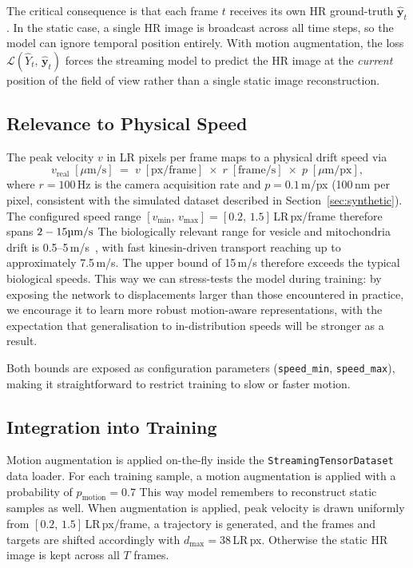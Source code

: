 The critical consequence is that each frame $t$ receives its own HR ground-truth
$\hat{\mathbf{y}}_t$.
In the static case, a single HR image is broadcast across all time steps, so the
model can ignore temporal position entirely.
With motion augmentation, the loss $\mathcal{L}(\hat{Y}_t,\,\hat{\mathbf{y}}_t)$
forces the streaming model to predict the HR image at the \emph{current} position
of the field of view rather than a single static image reconstruction.

\subsection{Relevance to Physical Speed}
\label{sec:speed_calibration}

The peak velocity $v$ in LR pixels per frame maps to a physical drift speed via
%
\begin{equation}
  v_\text{real}\;[\mu\text{m/s}]
    \;=\; v\;[\text{px/frame}]
    \;\times\; r\;[\text{frame/s}]
    \;\times\; p\;[\mu\text{m/px}],
  \label{eq:speed_calibration}
\end{equation}
%
where $r = 100$\,Hz is the camera acquisition rate and $p = 0.1$\,\textmu m/px
(100\,nm per pixel, consistent with the simulated dataset described in
Section~\ref{sec:synthetic}).
The configured speed range $[v_{\min},\,v_{\max}] = [0.2,\,1.5]$\,LR\,px/frame
therefore spans $2 - 15 \text{\textmu m/s}$
%
%
The biologically relevant range for vesicle and mitochondria drift is
0.5--5\,\textmu m/s~\cite{tang2013fast}, with fast kinesin-driven transport
reaching up to approximately 7.5\,\textmu m/s.
The upper bound of 15\,\textmu m/s therefore exceeds the typical biological speeds.
This way we can stress-tests the model during training: by exposing
the network to displacements larger than those encountered in practice, we encourage
it to learn more robust motion-aware representations, with the expectation that
generalisation to in-distribution speeds will be stronger as a result.

Both bounds are exposed as configuration parameters (\texttt{speed\_min},
\texttt{speed\_max}), making it straightforward to restrict training to slow
or faster motion.

\subsection{Integration into Training}
\label{sec:motion_training_integration}

Motion augmentation is applied on-the-fly inside the
\texttt{StreamingTensorDataset} data loader.
For each training sample, a motion augmentation is applied with a probability of $p_\text{motion} = 0.7$
This way model remembers to reconstruct static samples as well.
When augmentation is applied, peak velocity is drawn uniformly from $[0.2,\,1.5]$\,LR\,px/frame,
a trajectory is generated, and the frames and
targets are shifted accordingly with $d_{\max} = 38$\,LR\,px.
Otherwise the static HR image is kept across all $T$ frames.
